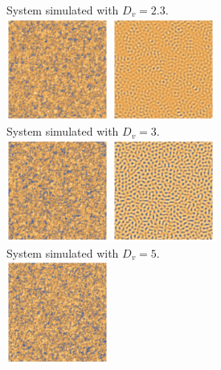 \begin{figure}[h]
    \centering
    System simulated with $D_v=2.3$.\\
    \includegraphics[width=0.3\textwidth]{img/2bd23transient.png}
    \includegraphics[width=0.3\textwidth]{img/2bd23.png}\\
    System simulated with $D_v=3$.\\
    \includegraphics[width=0.3\textwidth]{img/2bd3transient.png}
    \includegraphics[width=0.3\textwidth]{img/2bd3.png}\\
    System simulated with $D_v=5$.\\
    \includegraphics[width=0.3\textwidth]{img/2bd5transient.png}

\end{figure}

